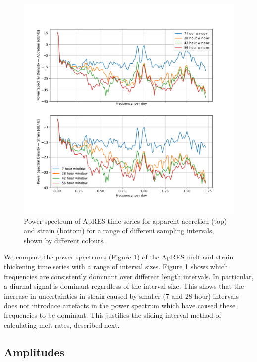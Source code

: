 \begin{figure}[!ht]
\centering
\includegraphics[width=1\textwidth]{chapters/3/compare_window.pdf}
\caption[]{Power spectrum of ApRES time series for apparent accretion (top) and strain (bottom) for a range of different sampling intervals, shown by different colours.}
\label{fig:compare_window}
\end{figure}
We compare the power spectrums (Figure \ref{fig:compare_window}) of the ApRES melt and strain thickening time series with a range of interval sizes. Figure \ref{fig:compare_window}  shows which frequencies are consistently dominant over different length intervals. In particular, a diurnal signal is dominant regardless of the interval size. This shows that the increase in uncertainties in strain caused by smaller (7 and 28 hour) intervals does not introduce artefacts in the power spectrum which have caused these frequencies to be dominant. This justifies the sliding interval method of calculating melt rates, described next.


\subsection{Amplitudes}

